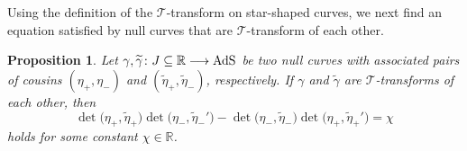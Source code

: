 \documentclass[pdftex]{sigma}
\numberwithin{equation}{section}
\newtheorem{Proposition}[Theorem]{Proposition}
 { \theoremstyle{definition}
\newtheorem{Definition}[Theorem]{Definition}
\newtheorem{Note}[Theorem]{Note}
\newtheorem{Example}[Theorem]{Example}
\newtheorem{Remark}[Theorem]{Remark} }
\def\R{\mathbb{R}}
\def\AdS{{\rm AdS}}
\begin{document}
Using the definition of the $\mathcal{T}$-transform on star-shaped curves, we next find an equation satisfied by null curves that are $\mathcal{T}$-transform of each other.

\begin{Proposition}\label{T1} Let $\gamma,\widetilde{\gamma}\colon J\subseteq\R\longrightarrow\AdS$ be two null curves with associated pairs of cousins $(\eta_+,\eta_-)$ and $(\widetilde{\eta}_+,\widetilde{\eta}_-)$, respectively. If $\gamma$ and $\widetilde{\gamma}$ are $\mathcal{T}$-transforms of each other, then
	\begin{equation}\label{chi}
		\det \bigl(\eta_+,\widetilde{\eta}_+\bigr)\det \bigl(\eta_-,\widetilde{\eta}_-'\bigr)-\det \bigl(\eta_-,\widetilde{\eta}_-\bigr)\det \bigl(\eta_+,\widetilde{\eta}_+'\bigr)=\chi
	\end{equation}
	holds for some constant $\chi\in\R$.
\end{Proposition}
\end{document}
